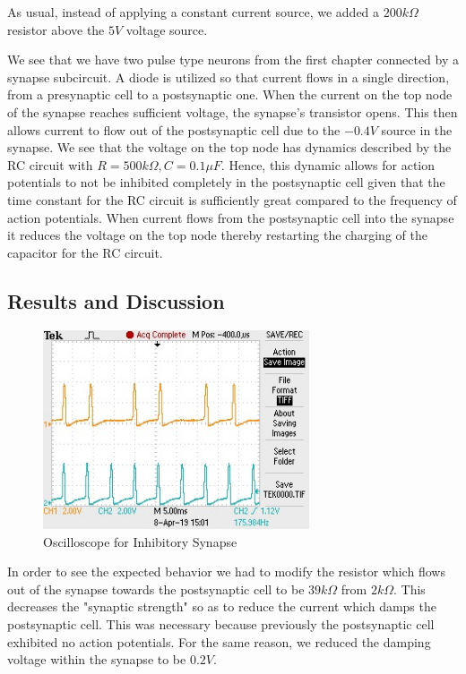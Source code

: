 \documentclass[12]{book}
\newcommand\0{\mathbf{0}}
\newcommand\<{\langle}
\renewcommand\>{\rangle}
\begin{document}
As usual, instead of applying a constant current source, we added a $200k\Omega$ resistor above the $5V$ voltage source.

We see that we have two pulse type neurons from the first chapter connected by a synapse subcircuit. A diode is utilized so that current flows in a single direction, from a presynaptic cell to a postsynaptic one. When the current on the top node of the synapse reaches sufficient voltage, the synapse's transistor opens. This then allows current to flow out of the postsynaptic cell due to the $-0.4V$ source in the synapse. We see that the voltage on the top node has dynamics described by the RC circuit with $R=500 k \Omega, C = 0.1 \mu F$. Hence, this dynamic allows for action potentials to not be inhibited completely in the postsynaptic cell given that the time constant for the RC circuit is sufficiently great compared to the frequency of action potentials. When current flows from the postsynaptic cell into the synapse it reduces the voltage on the top node thereby restarting the charging of the capacitor for the RC circuit.

\subsection{Results and Discussion}

\begin{figure}[h]
\centering
\includegraphics[width=0.7\textwidth]{inhibitory.jpg}	
\caption{Oscilloscope for Inhibitory Synapse}
\end{figure}

In order to see the expected behavior we had to modify the resistor which flows out of the synapse towards the postsynaptic cell to be $39k \Omega$ from $2k \Omega$. This decreases the "synaptic strength" so as to reduce the current which damps the postsynaptic cell. This was necessary because previously the postsynaptic cell exhibited no action potentials. For the same reason, we reduced the damping voltage within the synapse to be $0.2 V$. 
\end{document}
